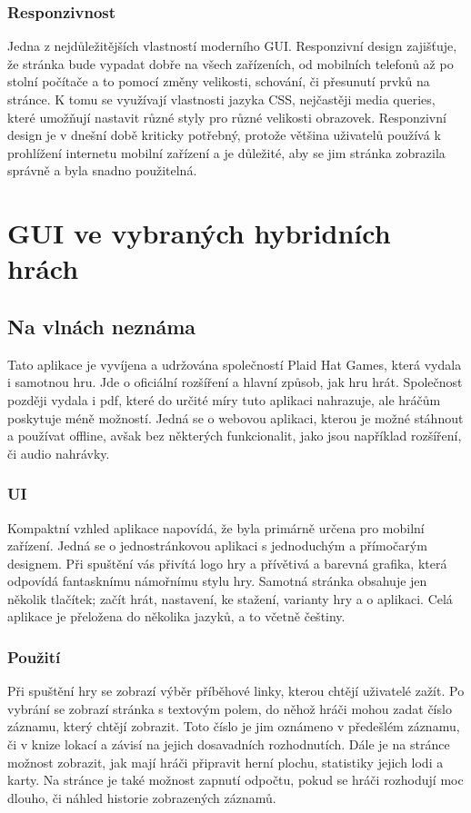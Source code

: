 \subsubsection{Responzivnost}
Jedna z nejdůležitějších vlastností moderního GUI. Responzivní design zajišťuje, že stránka bude vypadat dobře na všech zařízeních, od mobilních telefonů až po stolní počítače a to pomocí změny velikosti, schování, či přesunutí prvků na stránce. K tomu se využívají vlastnosti jazyka CSS, nejčastěji media queries, které umožňují nastavit různé styly pro různé velikosti obrazovek. Responzivní design je v dnešní době kriticky potřebný, protože většina uživatelů používá k prohlížení internetu mobilní zařízení a je důležité, aby se jim stránka zobrazila správně a byla snadno použitelná.\cite{responsive_design}

\section{GUI ve vybraných hybridních hrách}

\subsection{Na vlnách neznáma}
Tato aplikace je vyvíjena a udržována společností Plaid Hat Games, která vydala i samotnou hru. Jde o oficiální rozšíření a hlavní způsob, jak hru hrát. Společnost později vydala i pdf, které do určité míry tuto aplikaci nahrazuje, ale hráčům poskytuje méně možností. Jedná se o webovou aplikaci, kterou je možné stáhnout a používat offline, avšak bez některých funkcionalit, jako jsou například rozšíření, či audio nahrávky.

\subsubsection{UI}
Kompaktní vzhled aplikace napovídá, že byla primárně určena pro mobilní zařízení. Jedná se o jednostránkovou aplikaci s jednoduchým a přímočarým designem. Při spuštění vás přivítá logo hry a přívětivá a barevná grafika, která odpovídá fantasknímu námořnímu stylu hry. Samotná stránka obsahuje jen několik tlačítek; začít hrát, nastavení, ke stažení, varianty hry a o aplikaci. Celá aplikace je přeložena do několika jazyků, a to včetně češtiny.

\subsubsection{Použití}
Při spuštění hry se zobrazí výběr příběhové linky, kterou chtějí uživatelé zažít. Po vybrání se zobrazí stránka s textovým polem, do něhož hráči mohou zadat číslo záznamu, který chtějí zobrazit. Toto číslo je jim oznámeno v předešlém záznamu, či v knize lokací a závisí na jejich dosavadních rozhodnutích. Dále je na stránce možnost zobrazit, jak mají hráči připravit herní plochu, statistiky jejich lodi a karty. Na stránce je také možnost zapnutí odpočtu, pokud se hráči rozhodují moc dlouho, či náhled historie zobrazených záznamů.

